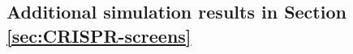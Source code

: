 \documentclass[12pt]{article}
\theoremstyle{definition}
\newcommand{\srx}{X}									%
\newcommand{\sry}{Y}									%
\newcommand{\dCRT}{\textnormal{dCRT}} 					%
\newcommand{\spacrt}{\textnormal{spaCRT}}               %
\begin{document}
  \subsection{Additional simulation results in Section \ref{sec:CRISPR-screens}}\label{sec:additional_simulation_results_CRISPR}

  
  
  
  
  
\end{document}
